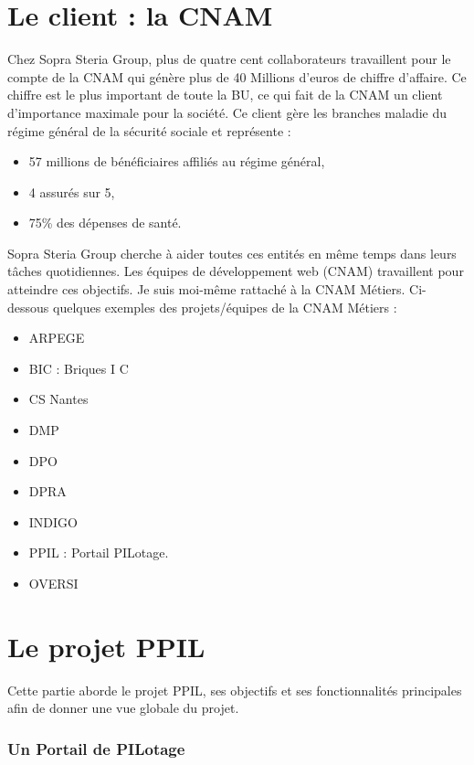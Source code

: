 \section{Le client : la CNAM}

Chez Sopra Steria Group, plus de quatre cent collaborateurs travaillent pour le compte de la CNAM qui génère plus de 40 Millions d’euros de chiffre d’affaire. Ce chiffre est le plus important de toute la BU, ce qui fait de la CNAM un client d’importance maximale pour la société. Ce client gère les branches maladie du régime général de la sécurité sociale et représente :

\begin{itemize}
    \item 57 millions de bénéficiaires affiliés au régime général, 
    \item 4 assurés sur 5, 
    \item 75\% des dépenses de santé. 
\end{itemize}

Sopra Steria Group cherche à aider toutes ces entités en même temps dans leurs tâches quotidiennes. Les équipes de développement web (CNAM) travaillent pour atteindre ces objectifs. Je suis moi-même rattaché à la CNAM Métiers. Ci-dessous quelques exemples des projets/équipes de la CNAM Métiers :

\begin{itemize}
    \item ARPEGE
    \item BIC : Briques I C
    \item CS Nantes
    \item DMP
    \item DPO
    \item DPRA
    \item INDIGO
    \item PPIL : Portail PILotage.
    \item OVERSI
\end{itemize}

\section{Le projet PPIL}

Cette partie aborde le projet PPIL, ses objectifs et ses fonctionnalités principales afin de donner une vue globale du projet.

\subsubsection{Un Portail de PILotage}

